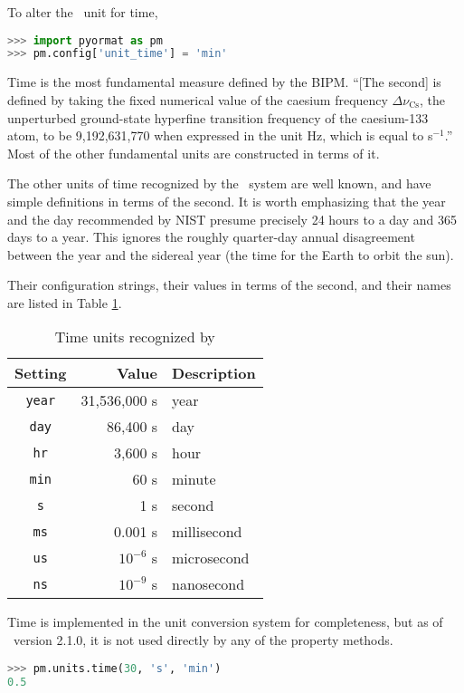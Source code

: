 To alter the \PM\ unit for time,
\begin{lstlisting}[language=Python]
>>> import pyormat as pm
>>> pm.config['unit_time'] = 'min'
\end{lstlisting}

Time is the most fundamental measure defined by the BIPM.  ``[The second] is defined by taking the fixed numerical value of the caesium frequency $\Delta \nu_\mathrm{Cs}$, the unperturbed ground-state hyperfine transition frequency of the caesium-133 atom, to be 9,192,631,770 when expressed in the unit Hz, which is equal to s$^{-1}$.''\cite{bipm}  Most of the other fundamental units are constructed in terms of it.

The other units of time recognized by the \PM\ system are well known, and have simple definitions in terms of the second.  It is worth emphasizing that the year and the day recommended by NIST \cite{nist:sp811} presume precisely 24 hours to a day and 365 days to a year.  This ignores the roughly quarter-day annual disagreement between the year and the sidereal year (the time for the Earth to orbit the sun).

Their configuration strings, their values in terms of the second, and their names are listed in Table \ref{tab:time}.

\begin{table}
\centering
\caption{Time units recognized by \PM}\label{tab:time}
\begin{tabular}{crl}
\hline
Setting & Value & Description\\
\hline
\verb|year| & 31,536,000 s & year\\
\verb|day| & 86,400 s & day\\
\verb|hr| & 3,600 s & hour\\
\verb|min| & 60 s & minute\\
\verb|s| & 1 s & second\\
\verb|ms| & 0.001 s & millisecond\\
\verb|us| & $10^{-6}$ s & microsecond\\
\verb|ns| & $10^{-9}$ s & nanosecond\\
\hline
\end{tabular}
\end{table}

Time is implemented in the unit conversion system for completeness, but as of \PM\ version 2.1.0, it is not used directly by any of the property methods.

\begin{lstlisting}[language=Python, caption=Time Conversion Example]
>>> pm.units.time(30, 's', 'min')
0.5
\end{lstlisting}

